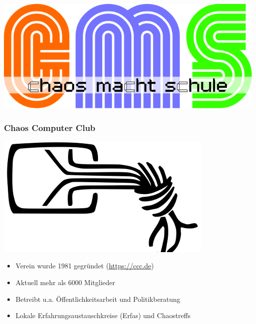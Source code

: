 \documentclass[12pt]{beamer}
\begin{document}
\begin{frame}
	\begin{center}
    	\includegraphics[height=0.5\textheight]{img/cms-text.png}
    \end{center}
\end{frame}

\begin{frame}
	\frametitle{Chaos Computer Club}
	\begin{center}
		\includegraphics[height=0.2\textheight]{img/chaosknoten.png}
	\end{center}	
	\begin{itemize}
		\item Verein wurde 1981 gegründet (\url{https://ccc.de})          
		\item Aktuell mehr als 6000 Mitglieder
		\item Betreibt u.a. Öffentlichkeitsarbeit und Politikberatung      
		\item Lokale Erfahrungsaustauschkreise (Erfas) und Chaostreffs
	\end{itemize}
\end{frame}
\end{document}
